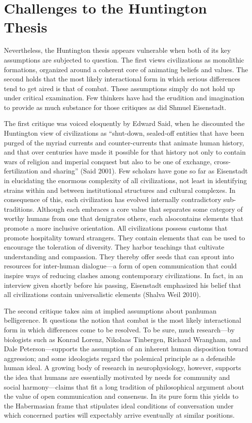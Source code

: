 \section*{Challenges to the Huntington Thesis}

Nevertheless, the Huntington thesis appears vulnerable when both of its key assumptions are subjected to question. The first views civilizations as monolithic formations, organized around a coherent core of animating beliefs and values. The second holds that the most likely interactional form in which serious differences tend to get aired is that of combat. These assumptions simply do not hold up under critical examination. Few thinkers have had the erudition and imagination to provide as much substance for those critiques as did Shmuel Eisenstadt. 

The first critique was voiced eloquently by Edward Said, when he discounted the Huntington view of civilizations as ``shut-down, sealed-off entities that have been purged of the myriad currents and counter-currents that animate human history, and that over centuries have made it possible for that history not only to contain wars of religion and imperial conquest but also to be one of exchange, cross-fertilization and sharing'' (Said 2001). Few scholars have gone so far as Eisenstadt in elucidating the enormous complexity of all civilizations, not least in identifying strains within and between institutional structures and cultural complexes. In consequence of this, each civilization has evolved internally contradictory sub-traditions. Although each embraces a core value that separates some category of worthy humans from one that denigrates others, each alsocontains elements that promote a more inclusive orientation. All civilizations possess customs that promote hospitality toward strangers. They contain elements that can be used to encourage the toleration of diversity. They harbor teachings that cultivate understanding and compassion. They thereby offer seeds that can sprout into resources for inter-human dialogue---a form of open communication that could inspire ways of reducing clashes among contemporary civilizations. In fact, in an interview given shortly before his passing, Eisenstadt emphasized his belief that all civilizations contain universalistic elements (Shalva Weil 2010).

The second critique takes aim at implied assumptions about panhuman belligerence. It questions the notion that combat is the most likely interactional form in which differences come to be resolved. To be sure, much research---by biologists such as Konrad Lorenz, Nikolaas Tinbergen, Richard Wrangham, and Dale Peterson---supports the assumption of an inherent human disposition toward aggression; and some ideologists regard the polemical principle as a defensible human ideal. A growing body of research in neurophysiology, however, supports the idea that humans are essentially motivated by needs for community and social harmony---claims that fit a long tradition of philosophical argument about the value of open communication and consensus. In its pure form this yields to the Habermasian frame that stipulates ideal conditions of conversation under which concerned parties will expectably arrive eventually at similar positions. 

